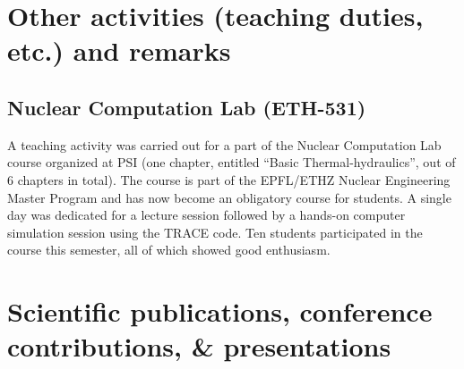 \documentclass[11pt,titlepage]{article}
\begin{document}
\section{Other activities (teaching duties, etc.) and remarks}

\subsection{Nuclear Computation Lab (ETH-531)}

A teaching activity was carried out for a part of the Nuclear Computation Lab 
course organized at PSI (one chapter, entitled ``Basic Thermal-hydraulics'', out of 
6 chapters in total). 
The course is part of the EPFL/ETHZ Nuclear Engineering Master Program and has 
now become an obligatory course for students.
A single day was dedicated for a lecture session followed by a hands-on computer
simulation session using the TRACE code.
Ten students participated in the course this semester, all of which showed good 
enthusiasm.

\section{Scientific publications, conference contributions, \& presentations}

\nocite{Wicaksono2016}
\nocite{Wicaksono2016a}
\nocite{Wicaksono2016b}
\nocite{WicaksonoPPTa}
\nocite{WicaksonoPPTb}

\printbibliography[heading=none]
\end{document}
